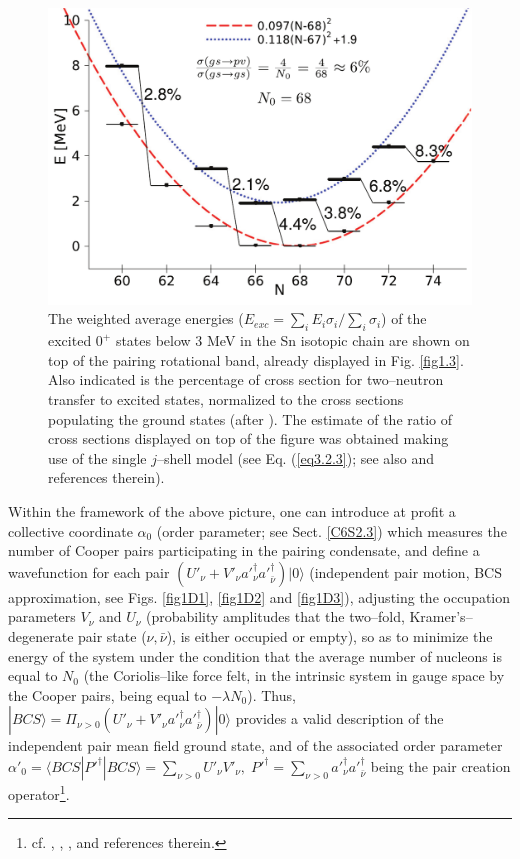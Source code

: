   \begin{figure}
  \centerline{\includegraphics*[width=\textwidth,angle=0]{nutshell/figs/fig2_1_4.pdf}}
  \caption{The weighted average energies ($E_{exc}=\sum_i E_i \sigma_i/\sum_i \sigma_i$) of the excited $0^+$ states below 3 MeV in the Sn isotopic chain are shown on top of the pairing rotational band, already displayed in Fig. \ref{fig1.3}. Also indicated is the percentage of cross section for two--neutron transfer to excited states, normalized to the cross sections populating the ground states (after \cite{Potel:13b}). The estimate of the ratio of cross sections displayed on top of the figure was obtained making use of the single $j$--shell model (see Eq. (\ref{eq3.2.3}); see also \cite{Brink:05} and references therein).}\label{fig1.4}
  \end{figure}
Within the framework of the above picture, one can introduce at profit a collective coordinate $\alpha_0$ (order parameter; see Sect. \ref{C6S2.3}) which measures the number of Cooper pairs participating in the pairing condensate, and define a wavefunction for each pair $\left(U'_\nu+V'_\nu a'^\dagger_\nu a'^\dagger_{\bar\nu}\right)|0\rangle$ (independent pair motion, BCS approximation, see Figs. \ref{fig1D1}, \ref{fig1D2} and \ref{fig1D3}), adjusting the occupation parameters $V_\nu$ and $U_\nu$ (probability amplitudes that the two--fold, Kramer's--degenerate pair state ($\nu,\bar{\nu}$), is either occupied or empty), so as to minimize the energy of the system under the condition that the average number of nucleons is equal to $N_0$ (the Coriolis--like force felt, in the intrinsic system in gauge space by the Cooper pairs, being equal to $-\lambda N_0$). Thus, $|BCS\rangle=\Pi_{\nu>0}\left(U'_\nu+V'_\nu a'^\dagger_\nu a'^\dagger_{\bar\nu}\right)|0\rangle$ provides a valid description of the independent pair mean field ground state, and of the associated order parameter $\alpha'_0=\langle BCS|P'^{\dagger}|BCS\rangle=\sum_{\nu>0}U'_\nu V'_\nu,\; P'^{\dagger}=\sum_{\nu>0}a'^\dagger_\nu a'^\dagger_{\bar \nu}$ being the pair creation operator\footnote{cf. \cite{Bardeen:57a}, \cite{Bardeen:57b}, \cite{Schrieffer:64}, \cite{Schrieffer:73} and references therein.}.

